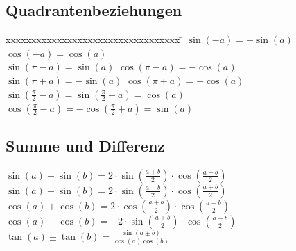 \begin{minipage}[t]{6cm}
	\subsection{Quadrantenbeziehungen}
	\begin{tabbing}
		xxxxxxxxxxxxxxxxxxxxxxxxxxxxxxxxxx \= \kill
		$\sin(-a)=-\sin(a)$ \> $\cos(-a)=\cos(a)$\\
		$\sin(\pi - a)=\sin(a)$ \> $\cos(\pi - a)=-\cos(a)$\\
		$\sin(\pi + a)=-\sin(a)$ \> $\cos(\pi +a)=-\cos(a)$\\
		$\sin\left(\frac{\pi}{2}-a \right)=\sin\left(\frac{\pi}{2}+a \right)=\cos(a)$\\
		$\cos\left(\frac{\pi}{2}-a \right)=-\cos\left(\frac{\pi}{2}+a \right)=\sin(a)$  
	\end{tabbing}
	
	\subsection{Summe und Differenz}
	$\sin(a)+\sin(b)=2 \cdot \sin \left(\frac{a+b}{2}\right) \cdot
	\cos\left(\frac{a-b}{2}\right)$\\
	$\sin(a)-\sin(b)=2 \cdot \sin \left(\frac{a-b}{2}\right) \cdot
	\cos\left(\frac{a+b}{2}\right)$\\
	$\cos(a)+\cos(b)=2 \cdot \cos \left(\frac{a+b}{2}\right) \cdot
	\cos\left(\frac{a-b}{2}\right)$\\
	$\cos(a)-\cos(b)=-2 \cdot \sin \left(\frac{a+b}{2}\right) \cdot
	\cos\left(\frac{a-b}{2}\right)$\\
	$\tan(a) \pm \tan(b)=\frac{\sin(a \pm b)}{\cos(a)\cos(b)}$
\end{minipage}

